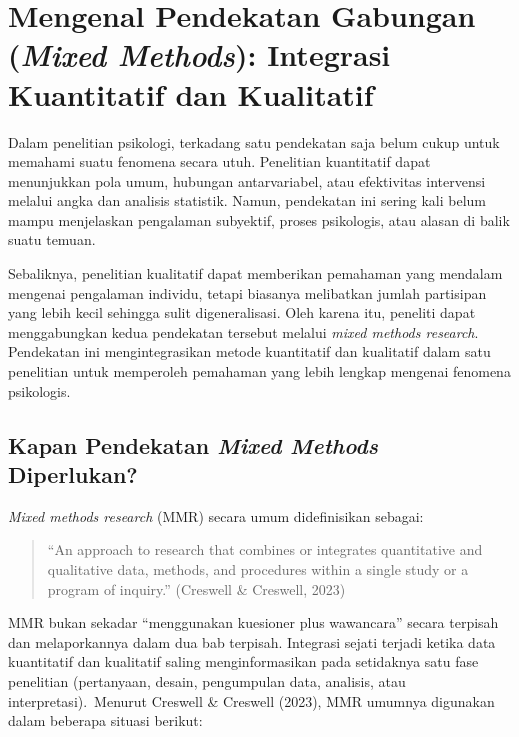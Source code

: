 \documentclass[
  indonesian,
  letterpaper,
  DIV=11,
  numbers=noendperiod]{scrreprt}
\begin{document}
\section{\texorpdfstring{Mengenal Pendekatan Gabungan (\emph{Mixed
Methods}): Integrasi Kuantitatif dan
Kualitatif}{Mengenal Pendekatan Gabungan (Mixed Methods): Integrasi Kuantitatif dan Kualitatif}}\label{sec-mixedmethod}

Dalam penelitian psikologi, terkadang satu pendekatan saja belum cukup
untuk memahami suatu fenomena secara utuh. Penelitian kuantitatif dapat
menunjukkan pola umum, hubungan antarvariabel, atau efektivitas
intervensi melalui angka dan analisis statistik. Namun, pendekatan ini
sering kali belum mampu menjelaskan pengalaman subyektif, proses
psikologis, atau alasan di balik suatu temuan.

Sebaliknya, penelitian kualitatif dapat memberikan pemahaman yang
mendalam mengenai pengalaman individu, tetapi biasanya melibatkan jumlah
partisipan yang lebih kecil sehingga sulit digeneralisasi. Oleh karena
itu, peneliti dapat menggabungkan kedua pendekatan tersebut melalui
\emph{mixed methods research}. Pendekatan ini mengintegrasikan metode
kuantitatif dan kualitatif dalam satu penelitian untuk memperoleh
pemahaman yang lebih lengkap mengenai fenomena psikologis.~

\subsection{\texorpdfstring{Kapan Pendekatan \emph{Mixed Methods}
Diperlukan?}{Kapan Pendekatan Mixed Methods Diperlukan?}}\label{kapan-pendekatan-mixed-methods-diperlukan}

\emph{Mixed methods research} (MMR) secara umum didefinisikan sebagai:

\begin{quote}
``An approach to research that combines or integrates quantitative and
qualitative data, methods, and procedures within a single study or a
program of inquiry.'' (Creswell \& Creswell, 2023)
\end{quote}

MMR bukan sekadar ``menggunakan kuesioner plus wawancara'' secara
terpisah dan melaporkannya dalam dua bab terpisah. Integrasi sejati
terjadi ketika data kuantitatif dan kualitatif saling menginformasikan
pada setidaknya satu fase penelitian (pertanyaan, desain, pengumpulan
data, analisis, atau interpretasi).~Menurut Creswell \& Creswell (2023),
MMR umumnya digunakan dalam beberapa situasi berikut:
\end{document}
